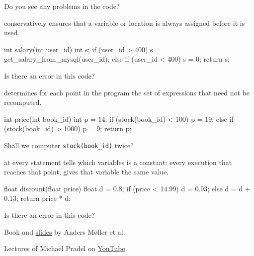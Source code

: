 \documentclass{article}
\begin{document}
Do you see any problems in the code?

\plush{}


 conservatively ensures that a variable or location is always assigned before it is used.

{\small
\begin{ffcode}
int salary(int user_id) {
  int s;
  if (user_id > 400) {
    s = get_salary_from_mysql(user_id);
  } else if (user_id < 400) {
    s = 0;
  }
  return s;
}
\end{ffcode}
}

Is there an error in this code?

\plush{}


 determines for each point in the program the set of expressions that need not be recomputed.

{\small
\begin{ffcode}
int price(int book_id) {
  int p = 14;
  if (stock(book_id) < 100) {
    p = 19;
  } else if (stock(book_id) > 1000) {
    p = 9;
  }
  return p;
}
\end{ffcode}
}

Shall we computer \texttt{stock(book\_id)} twice?

\plush{}


 at every statement tells which variables is a constant:
every execution that reaches that point, gives that variable the same value.

{\small
\begin{ffcode}
float discount(float price) {
  float d = 0.8;
  if (price < 14.99)
    d = 0.93;
  else
    d = d + 0.13;
  return price * d;
}
\end{ffcode}
}

Is there an error in this code?

\plush{}


Book and \href{http://cs.au.dk/~amoeller/spa/}{slides} by Anders M\o{}ller et al.

Lectures of Michael Pradel on \href{https://www.youtube.com/watch?v=rJYgTJaXZU0}{YouTube}.
\end{document}
